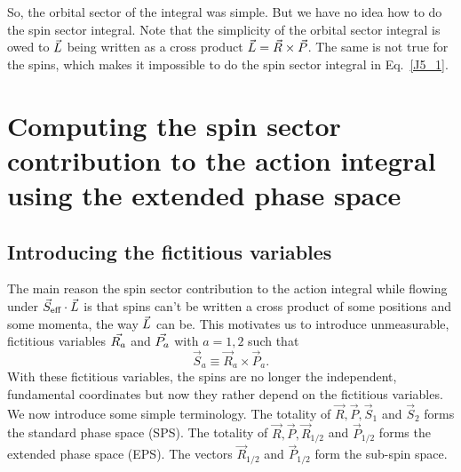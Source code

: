 So, the orbital sector of the integral was simple. But we have no idea how
to do the spin sector integral. Note that the simplicity of the orbital sector 
integral is owed to $\vec{L}$ being written as a cross product
$\vec{L} = \vec{R} \times \vec{P}$. The same is not true for the spins, which makes
it impossible to do the spin sector integral in Eq.~\eqref{J5_1}.





\section{Computing the spin sector  contribution to the action integral using the extended phase space}



\subsection{Introducing the fictitious variables}

The main reason the spin sector contribution to the action integral
while flowing under $\vec{S}_{\text{eff}}\cdot \vec{L}$ is that spins can't be written 
a cross product of some positions and some momenta, the way $\vec{L}$
can be. This motivates us to introduce unmeasurable, fictitious variables
$\vec{R_{a}}$ and $\vec{P_{a}}$ with $a = 1, 2$ such that
\begin{equation}
\vec{S}_{a} \equiv \vec{R}_{a} \times \vec{P}_{a}  . 
\end{equation}
With these fictitious variables, the spins are no longer the 
independent, fundamental coordinates but now they rather depend on
the fictitious variables. We now introduce some simple 
terminology. 
The totality of $\vec{R}, \vec{P}, \vec{S}_1$ and $\vec{S}_2$
forms the standard phase space (SPS).
The totality of $\vec{R}, \vec{P}, \vec{R}_{1/2}$ and $\vec{P}_{1/2}$
forms the extended phase space (EPS). 
The vectors $\vec{R}_{1/2}$ and $\vec{P}_{1/2}$ form the sub-spin space.




